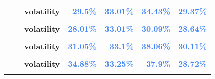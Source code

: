 \documentclass[
  authoryear,
  preprint,
  3p]{elsarticle}
\begin{document}
\begin{longtable}[t]{>{}l>{}l>{}l>{}r>{}r>{}r>{}r}
\textbf{} & \textbf{} & \textbf{volatility} & \textcolor[HTML]{4285f4}{\textbf{29.5\%}} & \textcolor[HTML]{4285f4}{\textbf{33.01\%}} & \textcolor[HTML]{4285f4}{\textbf{34.43\%}} & \textcolor[HTML]{4285f4}{\textbf{29.37\%}}\\
\addlinespace
\textbf{\cellcolor{gray!10}{}} & \textbf{\cellcolor{gray!10}{backwardation}} & \textbf{\cellcolor{gray!10}{mean}} & \textcolor[HTML]{4285f4}{\textbf{\cellcolor{gray!10}{-2.38\%}}} & \textcolor[HTML]{4285f4}{\textbf{\cellcolor{gray!10}{-2.22\%}}} & \textcolor[HTML]{4285f4}{\textbf{\cellcolor{gray!10}{18.24\%}}} & \textcolor[HTML]{4285f4}{\textbf{\cellcolor{gray!10}{18.64\%}}}\\
\textbf{} & \textbf{} & \textbf{volatility} & \textcolor[HTML]{4285f4}{\textbf{28.01\%}} & \textcolor[HTML]{4285f4}{\textbf{33.01\%}} & \textcolor[HTML]{4285f4}{\textbf{30.09\%}} & \textcolor[HTML]{4285f4}{\textbf{28.64\%}}\\
\textbf{\cellcolor{gray!10}{}} & \textbf{\cellcolor{gray!10}{contango}} & \textbf{\cellcolor{gray!10}{mean}} & \textcolor[HTML]{4285f4}{\textbf{\cellcolor{gray!10}{5.83\%}}} & \textcolor[HTML]{4285f4}{\textbf{\cellcolor{gray!10}{29.93\%}}} & \textcolor[HTML]{4285f4}{\textbf{\cellcolor{gray!10}{12.29\%}}} & \textcolor[HTML]{4285f4}{\textbf{\cellcolor{gray!10}{-8.64\%}}}\\
\textbf{} & \textbf{} & \textbf{volatility} & \textcolor[HTML]{4285f4}{\textbf{31.05\%}} & \textcolor[HTML]{4285f4}{\textbf{33.1\%}} & \textcolor[HTML]{4285f4}{\textbf{38.06\%}} & \textcolor[HTML]{4285f4}{\textbf{30.11\%}}\\
\textbf{\cellcolor{gray!10}{Sugar-\#11 (IFUS)}} & \textbf{\cellcolor{gray!10}{whole period}} & \textbf{\cellcolor{gray!10}{mean}} & \textcolor[HTML]{4285f4}{\textbf{\cellcolor{gray!10}{-4.56\%}}} & \textcolor[HTML]{4285f4}{\textbf{\cellcolor{gray!10}{24.87\%}}} & \textcolor[HTML]{4285f4}{\textbf{\cellcolor{gray!10}{11.82\%}}} & \textcolor[HTML]{4285f4}{\textbf{\cellcolor{gray!10}{-1.16\%}}}\\
\addlinespace
\textbf{} & \textbf{} & \textbf{volatility} & \textcolor[HTML]{4285f4}{\textbf{34.88\%}} & \textcolor[HTML]{4285f4}{\textbf{33.25\%}} & \textcolor[HTML]{4285f4}{\textbf{37.9\%}} & \textcolor[HTML]{4285f4}{\textbf{28.72\%}}\\
\textbf{\cellcolor{gray!10}{}} & \textbf{\cellcolor{gray!10}{backwardation}} & \textbf{\cellcolor{gray!10}{mean}} & \textcolor[HTML]{4285f4}{\textbf{\cellcolor{gray!10}{11.98\%}}} & \textcolor[HTML]{4285f4}{\textbf{\cellcolor{gray!10}{29.51\%}}} & \textcolor[HTML]{4285f4}{\textbf{\cellcolor{gray!10}{2.7\%}}} & \textcolor[HTML]{4285f4}{\textbf{\cellcolor{gray!10}{-8.07\%}}}\\

\end{longtable}
\end{document}
